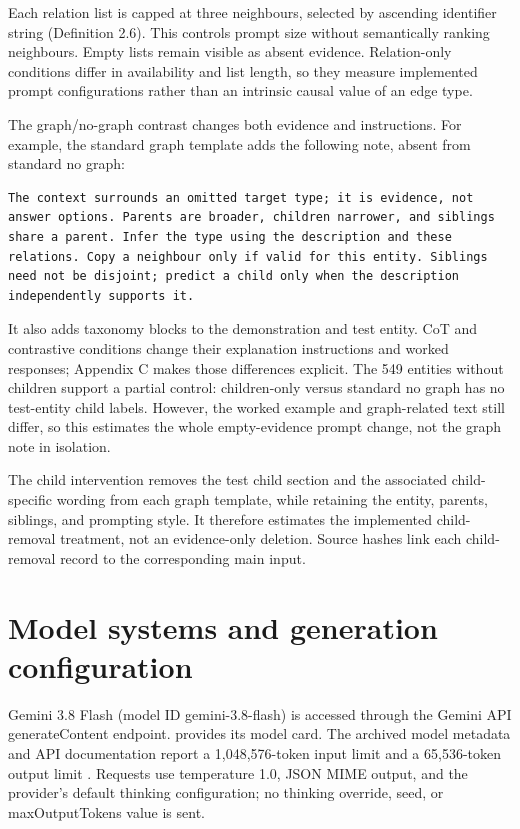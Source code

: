 Each relation list is capped at three neighbours, selected by ascending identifier string (Definition 2.6). This controls prompt size without semantically ranking neighbours. Empty lists remain visible as absent evidence. Relation-only conditions differ in availability and list length, so they measure implemented prompt configurations rather than an intrinsic causal value of an edge type.


The graph/no-graph contrast changes both evidence and instructions. For example, the standard graph template adds the following note, absent from standard no graph:


\begin{Verbatim}[fontsize=\footnotesize,breaklines=true,breakanywhere=true]
The context surrounds an omitted target type; it is evidence, not answer options. Parents are broader, children narrower, and siblings share a parent. Infer the type using the description and these relations. Copy a neighbour only if valid for this entity. Siblings need not be disjoint; predict a child only when the description independently supports it.
\end{Verbatim}

It also adds taxonomy blocks to the demonstration and test entity. CoT and contrastive conditions change their explanation instructions and worked responses; Appendix C makes those differences explicit. The 549 entities without children support a partial control: children-only versus standard no graph has no test-entity child labels. However, the worked example and graph-related text still differ, so this estimates the whole empty-evidence prompt change, not the graph note in isolation.


The child intervention removes the test child section and the associated child-specific wording from each graph template, while retaining the entity, parents, siblings, and prompting style. It therefore estimates the implemented child-removal treatment, not an evidence-only deletion. Source hashes link each child-removal record to the corresponding main input.


\FloatBarrier

\section{Model systems and generation configuration}

Gemini 3.8 Flash (model ID gemini-3.8-flash) is accessed through the Gemini API generateContent endpoint. \citet{googledeepmind2026} provides its model card. The archived model metadata and API documentation report a 1,048,576-token input limit and a 65,536-token output limit \citep{google2026}. Requests use temperature 1.0, JSON MIME output, and the provider’s default thinking configuration; no thinking override, seed, or maxOutputTokens value is sent.


